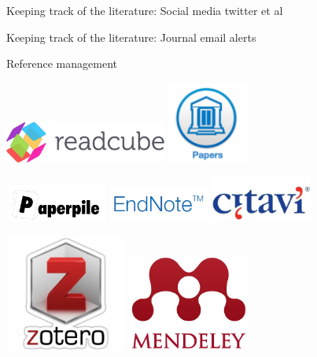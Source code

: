 \documentclass[10pt]{beamer}%
\begin{document}
\begin{frame}{Keeping track of the literature: Social media}
twitter et al
\end{frame}


\begin{frame}{Keeping track of the literature: Journal email alerts}
\end{frame}


\begin{frame}{Reference management}

\includegraphics[width=0.4\textwidth]{Figures/readcube} \hfill
\includegraphics[width=0.2\textwidth]{Figures/papers}

\includegraphics[width=0.25\textwidth]{Figures/reftruc}\hfill
\includegraphics[width=0.25\textwidth]{Figures/endnote}\hfill
\includegraphics[width=0.25\textwidth]{Figures/citavi}

\includegraphics[width=0.3\textwidth]{Figures/zotero}\hfill 
\includegraphics[width=0.3\textwidth]{Figures/mendeley}

\end{frame}
\end{document}
